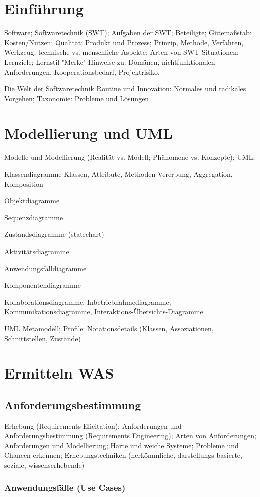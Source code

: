 %
%
%
\section{Einführung}
Software; Softwaretechnik (SWT); Aufgaben der SWT; Beteiligte;
Gütemaßstab: Kosten/Nutzen; Qualität; Produkt und Prozess; Prinzip, Methode, Verfahren, Werkzeug;
technische vs. menschliche Aspekte; Arten von SWT-Situationen; Lernziele; Lernstil
"Merke"-Hinweise zu: Domänen, nichtfunktionalen Anforderungen, Kooperationsbedarf,
Projektrisiko.

Die Welt der Softwaretechnik
Routine und Innovation: Normales und radikales Vorgehen; Taxonomie: Probleme und Lösungen 

\section{Modellierung und UML}
Modelle und Modellierung (Realität vs. Modell; Phänomene vs. Konzepte); UML;

Klassendiagramme
Klassen, Attribute, Methoden
Vererbung, Aggregation, Komposition

Objektdiagramme

Sequenzdiagramme

Zustandsdiagramme (statechart)

Aktivitätsdiagramme

Anwendungsfalldiagramme

Komponentendiagramme

Kollaborationsdiagramme,
Inbetriebnahmediagramme,
Kommunikationsdiagramme,
Interaktions-Übersichts-Diagramme

UML Metamodell; Profile;
Notationsdetails
(Klassen, Assoziationen, Schnittstellen, Zustände) 

\section{Ermitteln WAS}

\subsection{Anforderungsbestimmung}
Erhebung (Requirements Elicitation): Anforderungen und Anforderungsbestimmung
(Requirements Engineering); Arten von Anforderungen; Anforderungen und Modellierung;
Harte und weiche Systeme; Probleme und Chancen erkennen;
Erhebungstechniken (herkömmliche, darstellungs-basierte, soziale, wissenserhebende) 

\subsubsection{Anwendungsfälle (Use Cases)}

